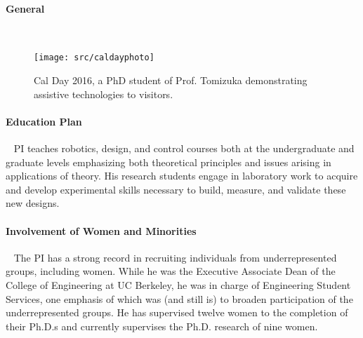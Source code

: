 

\paragraph*{General}~

\begin{wrapfigure}{R}{4.5cm}
\vspace{-25pt}
  \begin{center}
    \texttt{[image: src/caldayphoto]}
  \end{center}
  \vspace{-20pt}
  \caption{Cal Day 2016, a PhD student of Prof. Tomizuka demonstrating assistive technologies to visitors.\label{fig: cal day}}
  \vspace{-15pt}
\end{wrapfigure}

\paragraph*{Education Plan} ~
PI teaches robotics, design, and control courses both at the undergraduate and graduate levels emphasizing both theoretical principles and issues arising in applications of theory. His research students engage in laboratory work to acquire and develop experimental skills necessary to build, measure, and validate these new designs. 

\paragraph*{Involvement of Women and Minorities}~
The PI has a strong record in recruiting individuals from underrepresented groups, including women. While he was the Executive Associate Dean of the College of Engineering at UC Berkeley,  he was in charge of Engineering Student Services, one emphasis of which was (and still is) to broaden participation of the underrepresented groups. He has supervised twelve women to the completion of their Ph.D.s and currently supervises the Ph.D. research of nine women. 


